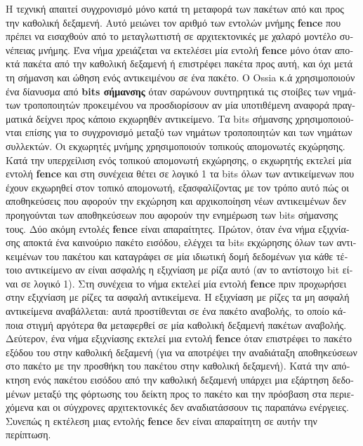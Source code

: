 \begin{greek}
Η τεχνική απαιτεί συγχρονισμό μόνο κατά τη μεταφορά των πακέτων
από και προς την καθολική δεξαμενή. Αυτό μειώνει τον αριθμό
των εντολών μνήμης \textbf{fence} που πρέπει να εισαχθούν από
το μεταγλωττιστή σε αρχιτεκτονικές με χαλαρό μοντέλο συνέπειας
μνήμης. Ένα νήμα χρειάζεται να εκτελέσει μία εντολή \textbf{fence}
μόνο όταν αποκτά πακέτα από την καθολική δεξαμενή ή επιστρέφει
πακέτα προς αυτή, και όχι μετά τη σήμανση και ώθηση ενός αντικειμένου
σε ένα πακέτο. Ο Ossia κ.ά χρησιμοποιούν ένα δίανυσμα από
\textbf{bits σήμανσης} όταν σαρώνουν συντηρητικά τις στοίβες
των νημάτων τροποποιητών προκειμένου να προσδιορίσουν αν μία
υποτιθέμενη αναφορά πραγματικά δείχνει προς κάποιο εκχωρηθέν
αντικείμενο. Τα bits σήμανσης χρησιμοποιούνται επίσης για το
συγχρονισμό μεταξύ των νημάτων τροποποιητών και των νημάτων
συλλεκτών. Οι εκχωρητές μνήμης χρησιμοποιούν τοπικούς απομονωτές
εκχώρησης. Κατά την υπερχείλιση ενός τοπικού απομονωτή εκχώρησης,
ο εκχωρητής εκτελεί μία εντολή \textbf{fence} και στη συνέχεια
θέτει σε λογικό 1 τα bits όλων των αντικείμενων που έχουν
εκχωρηθεί στον τοπικό απομονωτή, εξασφαλίζοντας με τον τρόπο
αυτό πώς οι αποθηκεύσεις που αφορούν την εκχώρηση και αρχικοποίηση
νέων αντικειμένων δεν προηγούνται των αποθηκεύσεων που αφορούν
την ενημέρωση των bits σήμανσης τους. Δύο ακόμη εντολές \textbf{fence}
είναι απαραίτητες. Πρώτον, όταν ένα νήμα εξιχνίασης αποκτά ένα
καινούριο πακέτο εισόδου, ελέγχει τα bits εκχώρησης όλων των
αντικειμένων του πακέτου και καταγράφει σε μία ιδιωτική δομή
δεδομένων για κάθε τέτοιο αντικείμενο αν είναι ασφαλής η
εξιχνίαση με ρίζα αυτό (αν το αντίστοιχο bit είναι σε λογικό
1). Στη συνέχεια το νήμα εκτελεί μία εντολή \textbf{fence}
πριν προχωρήσει στην εξιχνίαση με ρίζες τα ασφαλή αντικείμενα. 
Η εξιχνίαση με ρίζες τα μη ασφαλή αντικείμενα αναβάλλεται:
αυτά προστίθενται σε ένα πακέτο αναβολής, το οποίο κάποια
στιγμή αργότερα θα μεταφερθεί σε μία καθολική δεξαμενή
πακέτων αναβολής. Δεύτερον, ένα νήμα εξιχνίασης εκτελεί
μια εντολή \textbf{fence} όταν επιστρέφει το πακέτο εξόδου
του στην καθολική δεξαμενή (για να αποτρέψει την αναδιάταξη
αποθηκεύσεων στο πακέτο με την προσθήκη του πακέτου στην
καθολική δεξαμενή). Κατά την απόκτηση ενός πακέτου εισόδου
από την καθολική δεξαμενή υπάρχει μια εξάρτηση δεδομένων
μεταξύ της φόρτωσης του δείκτη προς το πακέτο και την πρόσβαση
στα περιεχόμενα και οι σύγχρονες αρχιτεκτονικές δεν αναδιατάσσουν
τις παραπάνω ενέργειες. Συνεπώς η εκτέλεση μιας εντολής
\textbf{fence} δεν είναι απαραίτητη σε αυτήν την περίπτωση.


\end{greek}
